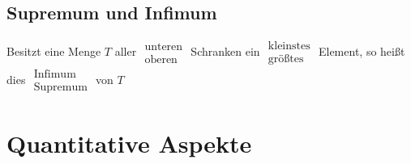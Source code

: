 \documentclass[a4paper,portrait]{scrartcl}
\begin{document}
\subsection{Supremum und Infimum}
Besitzt eine Menge $T$ aller
$\begin{array}{ll}
\text{unteren} \\
\text{oberen}
\end{array}$
Schranken ein 
$\begin{array}{ll}
\text{kleinstes} \\
\text{größtes}
\end{array}$
Element, so heißt dies 
$\begin{array}{ll}
\text{Infimum} \\
\text{Supremum}
\end{array}$
von $T$
\section{Quantitative Aspekte}
\end{document}

